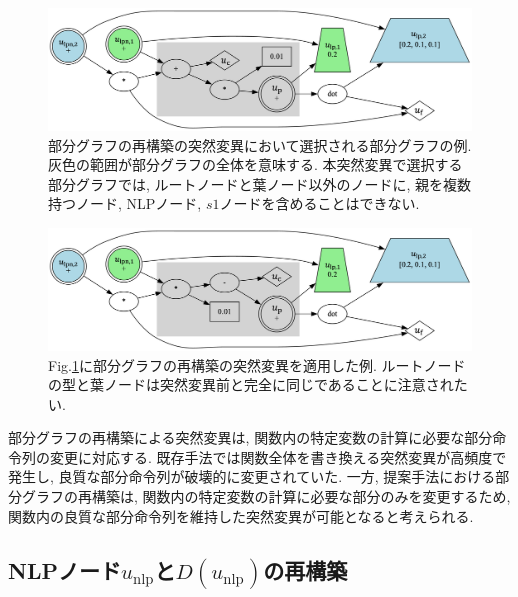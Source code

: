 \documentclass[11pt,oneside,openany,report]{jsbook}
\begin{document}
\begin{figure}
  \centering
  \includegraphics[width=14cm]{mgg_automl_zero_vag/mutations/subgraph.png}
  \caption{部分グラフの再構築の突然変異において選択される部分グラフの例. 灰色の範囲が部分グラフの全体を意味する. 本突然変異で選択する部分グラフでは, ルートノードと葉ノード以外のノードに, 親を複数持つノード, NLPノード, $s1$ノードを含めることはできない.}
  \label{fig:mgg_automl_zero_vag:mutation:subgraph}
\end{figure}

\begin{figure}
  \centering
  \includegraphics[width=14cm]{mgg_automl_zero_vag/mutations/mutated_subgraph.png}
  \caption{Fig.\ref{fig:mgg_automl_zero_vag:mutation:subgraph}に部分グラフの再構築の突然変異を適用した例. ルートノードの型と葉ノードは突然変異前と完全に同じであることに注意されたい.}
  \label{fig:mgg_automl_zero_vag:mutation:mutated_subgraph}
\end{figure}

部分グラフの再構築による突然変異は, 関数内の特定変数の計算に必要な部分命令列の変更に対応する. 既存手法では関数全体を書き換える突然変異が高頻度で発生し, 良質な部分命令列が破壊的に変更されていた. 一方, 提案手法における部分グラフの再構築は, 関数内の特定変数の計算に必要な部分のみを変更するため, 関数内の良質な部分命令列を維持した突然変異が可能となると考えられる.

\subsection{NLPノード$u_\mathrm{nlp}$と$D(u_\mathrm{nlp})$の再構築}
\end{document}
